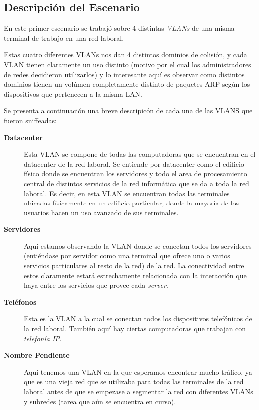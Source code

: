 \subsection{Descripci\'on del Escenario}
	\par En este primer escenario se trabaj\'o sobre 4 distintas \textit{VLANs}
    de una misma terminal de trabajo en una red laboral.
    
    \par Estas cuatro diferentes VLANs nos dan 4 distintos dominios de colisi\'on,
    y cada VLAN tienen claramente un uso distinto (motivo por el cual los
    administradores de redes decidieron utilizarlos) y lo interesante aqu\'i
    es observar como distintos dominios tienen un vol\'umen completamente distinto
    de paquetes ARP seg\'un los dispositivos que pertenecen a la misma LAN.
    
    \par Se presenta a continuaci\'on una breve descripic\'on de cada una de las
    VLANS que fueron sniffeadas:
    
    \begin{description}
    	\item[\textbf{Datacenter}] Esta VLAN se compone de todas las computadoras que se
        	encuentran en el datacenter de la red laboral. Se entiende por
            datacenter como el edificio f\'isico donde se encuentran los servidores
            y todo el area de procesamiento central de distintos servicios de la
            red inform\'atica que se da a toda la red laboral. Es decir, en esta
            VLAN se encuentran todas las terminales ubicadas f\'isicamente en un
            edificio particular, donde la mayor\'ia de los usuarios hacen un uso
            avanzado de sus terminales.
            
		\item[\textbf{Servidores}] Aqu\'i estamos observando la VLAN donde se conectan todos
        	los servidores (enti\'endase por servidor como una terminal que ofrece
            uno o varios servicios particulares al resto de la red) de la red. La
            conectividad entre estos claramente estar\'a estrechamente relacionada
            con la interacci\'on que haya entre los servicios que provee cada
            \textit{server}.
            
		\item[\textbf{Tel\'efonos}] Esta es la VLAN a la cual se conectan todos los
        	dispositivos telef\'onicos de la red laboral. Tambi\'en aqu\'i hay
            ciertas computadoras que trabajan con \textit{telefon\'ia IP}.
            
		\item[\textbf{Nombre Pendiente}] Aqu\'i tenemos una VLAN en la que esperamos encontrar
        	mucho tr\'afico, ya que es una vieja red que se utilizaba para todas
            las terminales de la red laboral antes de que se empezase a segmentar
            la red con diferentes VLANs y subredes (tarea que a\'un se encuentra
            en curso).
            
    \end{description} 
    \bigskip

